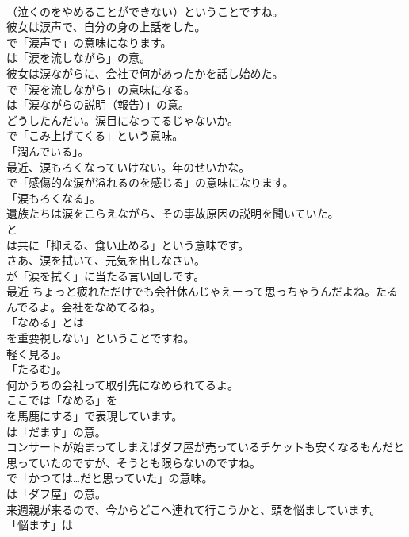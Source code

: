 \documentclass[8pt]{extreport}
\begin{document}
\begin{CJK}{UTF8}{min}
\\	（泣くのをやめることができない）ということですね。	
\\	彼女は涙声で、自分の身の上話をした。 
\\	で「涙声で」の意味になります。
\\	は「涙を流しながら」の意。	
\\	彼女は涙ながらに、会社で何があったかを話し始めた。 
\\	で「涙を流しながら」の意味になる。
\\	は「涙ながらの説明（報告）」の意。	
\\	どうしたんだい。涙目になってるじゃないか。 
\\	で「こみ上げてくる」という意味。
\\	「潤んでいる」。	
\\	最近、涙もろくなっていけない。年のせいかな。 
\\	で「感傷的な涙が溢れるのを感じる」の意味になります。
\\	「涙もろくなる」。	
\\	遺族たちは涙をこらえながら、その事故原因の説明を聞いていた。 
\\	と
\\	は共に「抑える、食い止める」という意味です。	
\\	さあ、涙を拭いて、元気を出しなさい。 
\\	が「涙を拭く」に当たる言い回しです。	
\\	最近 ちょっと疲れただけでも会社休んじゃえーって思っちゃうんだよね。たるんでるよ。会社をなめてるね。 
\\	「なめる」とは
\\	を重要視しない」ということですね。
\\	軽く見る」。
\\	「たるむ」。	
\\	何かうちの会社って取引先になめられてるよ。 
\\	ここでは「なめる」を
\\	を馬鹿にする」で表現しています。
\\	は「だます」の意。	
\\	コンサートが始まってしまえばダフ屋が売っているチケットも安くなるもんだと思っていたのですが、そうとも限らないのですね。 
\\	で「かつては…だと思っていた」の意味。
\\	は「ダフ屋」の意。	
\\	来週親が来るので、今からどこへ連れて行こうかと、頭を悩ましています。 
\\	「悩ます」は

\end{CJK}
\end{document}
